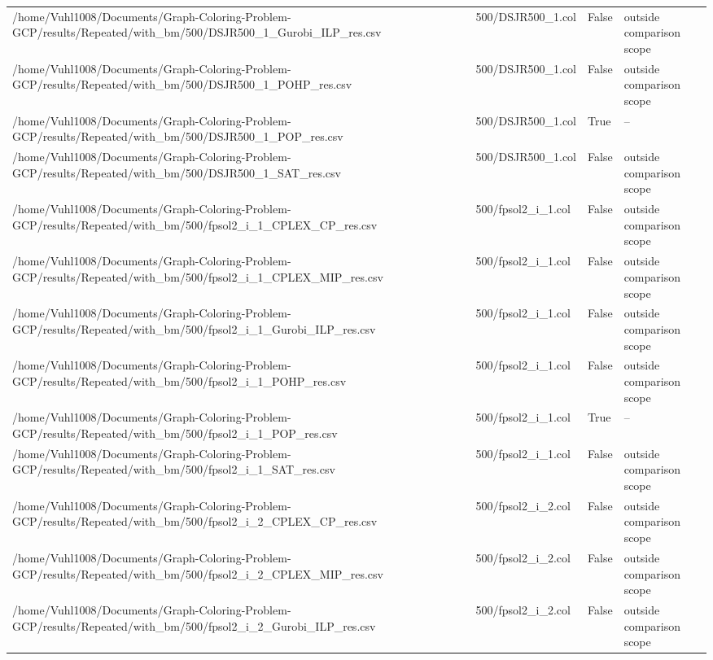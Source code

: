 \begin{table}[htbp]
\begin{tabular}{llll}
/home/Vuhl1008/Documents/Graph-Coloring-Problem-GCP/results/Repeated/with\_bm/500/DSJR500\_1\_Gurobi\_ILP\_res.csv & 500/DSJR500\_1.col & False & outside comparison scope \\
/home/Vuhl1008/Documents/Graph-Coloring-Problem-GCP/results/Repeated/with\_bm/500/DSJR500\_1\_POHP\_res.csv & 500/DSJR500\_1.col & False & outside comparison scope \\
/home/Vuhl1008/Documents/Graph-Coloring-Problem-GCP/results/Repeated/with\_bm/500/DSJR500\_1\_POP\_res.csv & 500/DSJR500\_1.col & True & -- \\
/home/Vuhl1008/Documents/Graph-Coloring-Problem-GCP/results/Repeated/with\_bm/500/DSJR500\_1\_SAT\_res.csv & 500/DSJR500\_1.col & False & outside comparison scope \\
/home/Vuhl1008/Documents/Graph-Coloring-Problem-GCP/results/Repeated/with\_bm/500/fpsol2\_i\_1\_CPLEX\_CP\_res.csv & 500/fpsol2\_i\_1.col & False & outside comparison scope \\
/home/Vuhl1008/Documents/Graph-Coloring-Problem-GCP/results/Repeated/with\_bm/500/fpsol2\_i\_1\_CPLEX\_MIP\_res.csv & 500/fpsol2\_i\_1.col & False & outside comparison scope \\
/home/Vuhl1008/Documents/Graph-Coloring-Problem-GCP/results/Repeated/with\_bm/500/fpsol2\_i\_1\_Gurobi\_ILP\_res.csv & 500/fpsol2\_i\_1.col & False & outside comparison scope \\
/home/Vuhl1008/Documents/Graph-Coloring-Problem-GCP/results/Repeated/with\_bm/500/fpsol2\_i\_1\_POHP\_res.csv & 500/fpsol2\_i\_1.col & False & outside comparison scope \\
/home/Vuhl1008/Documents/Graph-Coloring-Problem-GCP/results/Repeated/with\_bm/500/fpsol2\_i\_1\_POP\_res.csv & 500/fpsol2\_i\_1.col & True & -- \\
/home/Vuhl1008/Documents/Graph-Coloring-Problem-GCP/results/Repeated/with\_bm/500/fpsol2\_i\_1\_SAT\_res.csv & 500/fpsol2\_i\_1.col & False & outside comparison scope \\
/home/Vuhl1008/Documents/Graph-Coloring-Problem-GCP/results/Repeated/with\_bm/500/fpsol2\_i\_2\_CPLEX\_CP\_res.csv & 500/fpsol2\_i\_2.col & False & outside comparison scope \\
/home/Vuhl1008/Documents/Graph-Coloring-Problem-GCP/results/Repeated/with\_bm/500/fpsol2\_i\_2\_CPLEX\_MIP\_res.csv & 500/fpsol2\_i\_2.col & False & outside comparison scope \\
/home/Vuhl1008/Documents/Graph-Coloring-Problem-GCP/results/Repeated/with\_bm/500/fpsol2\_i\_2\_Gurobi\_ILP\_res.csv & 500/fpsol2\_i\_2.col & False & outside comparison scope \\

\end{tabular}
\end{table}

